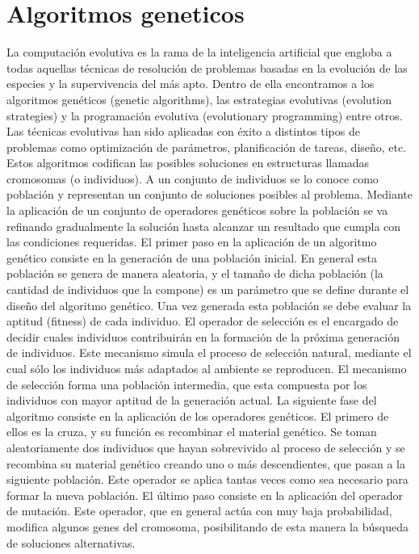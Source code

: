 \section{Algoritmos geneticos}
La computaci\'on evolutiva es la rama de la inteligencia artificial que engloba
a todas aquellas t\'ecnicas de resoluci\'on de problemas basadas en la evoluci\'on
de las especies y la supervivencia del m\'as apto.
Dentro de ella encontramos a los algoritmos gen\'eticos (genetic algorithms), las
estrategias evolutivas (evolution strategies) y la programaci\'on evolutiva
(evolutionary programming) entre otros.
Las t\'ecnicas evolutivas han sido aplicadas con \'exito a distintos tipos de
problemas como optimizaci\'on de par\'ametros, planificaci\'on de tareas, dise\~no,
etc.
Estos algoritmos codifican las posibles soluciones en estructuras llamadas
cromosomas (o individuos). A un conjunto de individuos se lo conoce como
poblaci\'on y representan un conjunto de soluciones posibles al problema.
Mediante la aplicaci\'on de un conjunto de operadores
gen\'eticos sobre la poblaci\'on se va refinando gradualmente la soluci\'on hasta
alcanzar un resultado que cumpla con las condiciones requeridas.
El primer paso en la aplicaci\'on de un algoritmo gen\'etico consiste en la
generaci\'on de una poblaci\'on inicial. En general esta poblaci\'on se genera de
manera aleatoria, y el tama\~no de dicha poblaci\'on (la cantidad de individuos que
la compone) es un par\'ametro que se define durante el dise\~no del algoritmo
gen\'etico. Una vez generada esta poblaci\'on se debe evaluar la aptitud (fitness)
de cada individuo.
El operador de selecci\'on es el encargado de decidir cuales individuos
contribuir\'an en la formaci\'on de la pr\'oxima generaci\'on de individuos. Este
mecanismo simula el proceso de selecci\'on natural, mediante el cual s\'olo los
individuos m\'as adaptados al ambiente se reproducen. El
mecanismo de selecci\'on forma una poblaci\'on intermedia, que esta compuesta
por los individuos con mayor aptitud de la generaci\'on actual.
La siguiente fase del algoritmo consiste en la aplicaci\'on de los operadores
gen\'eticos. El primero de ellos es la cruza, y su funci\'on es recombinar el
material gen\'etico. Se toman aleatoriamente dos individuos que hayan
sobrevivido al proceso de selecci\'on y se recombina su material gen\'etico
creando uno o m\'as descendientes, que pasan a la siguiente poblaci\'on. Este
operador se aplica tantas veces como sea necesario para formar la nueva
poblaci\'on.
El \'ultimo paso consiste en la aplicaci\'on del operador de mutaci\'on. Este
operador, que en general act\'ua con muy baja probabilidad, modifica algunos
genes del cromosoma, posibilitando de esta manera la b\'usqueda de soluciones
alternativas.

